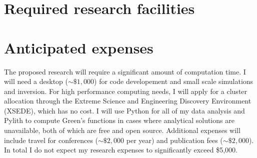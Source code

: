 \documentclass[12pt]{article}
\begin{document}
\section*{Required research facilities}
 
\section*{Anticipated expenses}
The proposed research will require a significant amount of computation time.  I will need a desktop (${\sim}\$1,000$) for code developement and small scale simulations and inversion.  For high performance computing needs, I will apply for a cluster allocation through the Extreme Science and Engineering Discovery Environment (XSEDE), which has no cost.  I will use Python for all of my data analysis and Pylith \citep{Aagaard2013} to compute Green's functions in cases where analytical solutions are unavailable, both of which are free and open source.  Additional expenses will include travel for conferences (${\sim}\$2,000$ per year) and publication fees (${\sim}\$2,000$). In total I do not expect my research expenses to significantly exceed \$5,000.   



%


\end{document}
